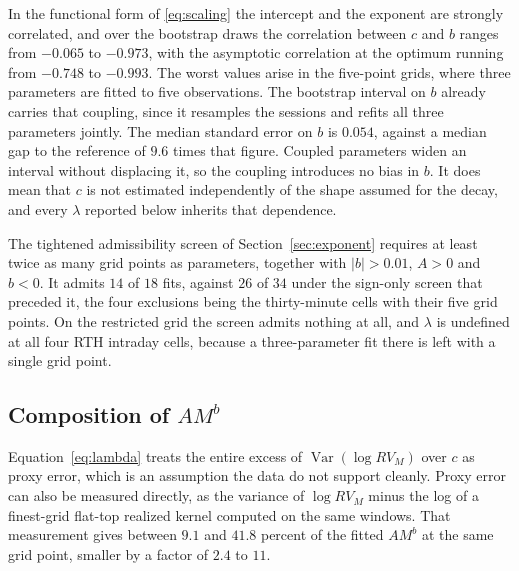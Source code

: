 In the functional form of \eqref{eq:scaling} the intercept and the exponent are
strongly correlated, and over the bootstrap draws the correlation between $c$ and
$b$ ranges from $-0.065$ to $-0.973$, with the asymptotic correlation at the %
optimum running from $-0.748$ to $-0.993$. The worst values arise in the %
five-point grids, where three parameters are fitted to five observations. The
bootstrap interval on $b$
already carries that coupling, since it resamples the sessions and refits all
three parameters jointly. The median standard error on $b$ is $0.054$, against a %
median gap to the reference of $9.6$ times that figure. Coupled parameters widen %
an interval without displacing it, so the coupling introduces no bias in $b$. It
does mean that $c$ is not estimated independently of the shape assumed for the
decay, and every $\lambda$ reported below inherits that dependence.

The tightened admissibility screen of Section~\ref{sec:exponent} requires at
least twice as many grid points as parameters, together with $|b| > 0.01$,
$A > 0$ and $b < 0$. It admits $14$ of $18$ fits, against $26$ of $34$ under the %
sign-only screen that preceded it, the four exclusions being the thirty-minute
cells with their five grid points. On the restricted grid the screen admits
nothing at all, and $\lambda$ is undefined at all four RTH intraday cells,
because a three-parameter fit there is left with a single grid point. %

\subsection{Composition of $A M^{b}$}

Equation~\eqref{eq:lambda} treats the entire excess of
$\operatorname{Var}(\log RV_M)$ over $c$ as proxy error, which is an assumption
the data do not support cleanly. Proxy error can also be measured directly, as
the variance of $\log RV_M$ minus the log of a finest-grid flat-top realized
kernel \citep{bnhls2008} computed on the same windows. That measurement gives
between $9.1$ and $41.8$ percent of the fitted $A M^{b}$ at the same grid point, %
smaller by a factor of $2.4$ to $11$. %

